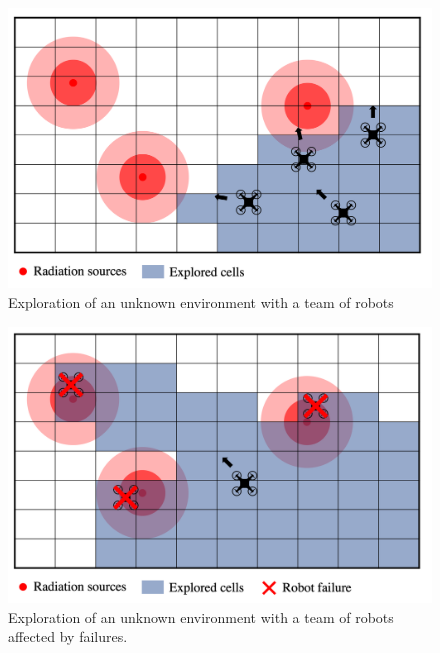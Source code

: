 \begin{figure}[H]
	\centering
    \includegraphics[width=0.70\columnwidth]{images/problemStatement1.png}
    \caption{Exploration of an unknown environment with a team of robots}
    \label{statementDORA1}
\end{figure}

\begin{figure}[H]
	\centering
    \includegraphics[width=0.70\columnwidth]{images/problemStatement2.png}
    \caption{Exploration of an unknown environment with a team of robots affected by failures.}
    \label{statementDORA2}
\end{figure}


